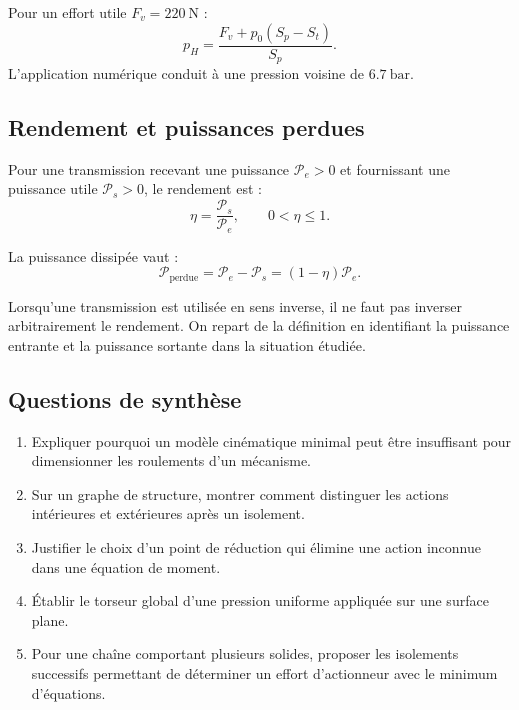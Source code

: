 Pour un effort utile $F_v=\SI{220}{\newton}$ :
\[
p_H=\frac{F_v+p_0(S_p-S_t)}{S_p}.
\]
L'application numérique conduit à une pression voisine de
$\SI{6.7}{\bar}$.

\subsection{Rendement et puissances perdues}

Pour une transmission recevant une puissance $\mathcal P_e>0$ et
fournissant une puissance utile $\mathcal P_s>0$, le rendement est :
\[
\eta=\frac{\mathcal P_s}{\mathcal P_e},
\qquad 0<\eta\leq1.
\]

La puissance dissipée vaut :
\[
\mathcal P_{\mathrm{perdue}}
=\mathcal P_e-\mathcal P_s
=(1-\eta)\mathcal P_e.
\]

Lorsqu'une transmission est utilisée en sens inverse, il ne faut pas
inverser arbitrairement le rendement. On repart de la définition en
identifiant la puissance entrante et la puissance sortante dans la
situation étudiée.

\subsection{Questions de synthèse}

\begin{enumerate}
  \item Expliquer pourquoi un modèle cinématique minimal peut être
        insuffisant pour dimensionner les roulements d'un mécanisme.
  \item Sur un graphe de structure, montrer comment distinguer les
        actions intérieures et extérieures après un isolement.
  \item Justifier le choix d'un point de réduction qui élimine une action
        inconnue dans une équation de moment.
  \item Établir le torseur global d'une pression uniforme appliquée sur
        une surface plane.
  \item Pour une chaîne comportant plusieurs solides, proposer les
        isolements successifs permettant de déterminer un effort
        d'actionneur avec le minimum d'équations.
\end{enumerate}
